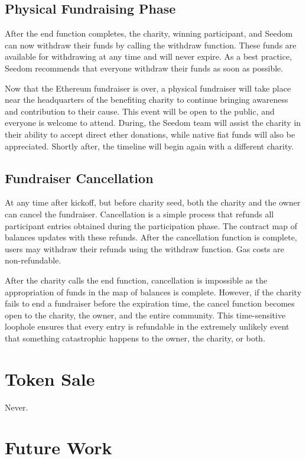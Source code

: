 \documentclass[11pt]{article}
\begin{document}
\subsection{Physical Fundraising Phase}

After the end function completes, the charity, winning participant, and Seedom can now withdraw their funds by calling the withdraw function. These funds are available for withdrawing at any time and will never expire. As a best practice, Seedom recommends that everyone withdraw their funds as soon as possible.

Now that the Ethereum fundraiser is over, a physical fundraiser will take place near the headquarters of the benefiting charity to continue bringing awareness and contribution to their cause. This event will be open to the public, and everyone is welcome to attend. During, the Seedom team will assist the charity in their ability to accept direct ether donations, while native fiat funds will also be appreciated. Shortly after, the timeline will begin again with a different charity.

\subsection{Fundraiser Cancellation}

At any time after kickoff, but before charity seed, both the charity and the owner can cancel the fundraiser. Cancellation is a simple process that refunds all participant entries obtained during the participation phase. The contract map of balances updates with these refunds. After the cancellation function is complete, users may withdraw their refunds using the withdraw function. Gas costs are non-refundable.

After the charity calls the end function, cancellation is impossible as the appropriation of funds in the map of balances is complete. However, if the charity fails to end a fundraiser before the expiration time, the cancel function becomes open to the charity, the owner, and the entire community. This time-sensitive loophole ensures that every entry is refundable in the extremely unlikely event that something catastrophic happens to the owner, the charity, or both.

\section{Token Sale}
Never.

\section{Future Work}
\end{document}
